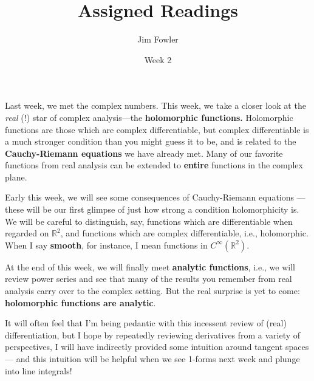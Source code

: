 \documentclass{homework}
\author{Jim Fowler}
\title{Assigned Readings}
\date{Week 2}
\begin{document}
\maketitle

Last week, we met the complex numbers.  This week, we take a closer
look at the \textit{real} (!) star of complex analysis---the
\textbf{holomorphic functions.}  Holomorphic functions are those which
are complex differentiable, but complex differentiable is a much
stronger condition than you might guess it to be, and is related to
the \textbf{Cauchy-Riemann equations} we have already met.  Many of
our favorite functions from real analysis can be extended to
\textbf{entire} functions in the complex plane.

Early this week, we will see some consequences of Cauchy-Riemann
equations --- these will be our first glimpse of just how strong a
condition holomorphicity is.  We will be careful to distinguish, say,
functions which are differentiable when regarded on $\mathbb{R}^2$,
and functions which are complex differentiable, i.e., holomorphic.
When I say \textbf{smooth}, for instance, I mean functions in
$C^\infty(\mathbb{R}^2)$.

At the end of this week, we will finally meet \textbf{analytic
  functions}, i.e., we will review power series and see that many of
the results you remember from real analysis carry over to the complex
setting.  But the real surprise is yet to come: \textbf{holomorphic
  functions are analytic}.

It will often feel that I'm being pedantic with this incessent review
of (real) differentiation, but I hope by repeatedly reviewing
derivatives from a variety of perspectives, I will have indirectly
provided some intuition around tangent spaces --- and this intuition
will be helpful when we see 1-forms next week and plunge into line
integrals!
\end{document}

